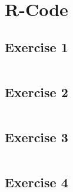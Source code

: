 \documentclass{article}
\begin{document}
    
  \section{R-Code}
    \subsection{Exercise 1}\label{sec:RE1}
      \begin{lstlisting}[language=R]
      \end{lstlisting}
    \subsection{Exercise 2}\label{sec:RE2}
      \begin{lstlisting}[language=R]
      \end{lstlisting}
    \subsection{Exercise 3}\label{sec:RE3}
      \begin{lstlisting}[language=R]
      \end{lstlisting}
    \subsection{Exercise 4}\label{sec:RE4}
      \begin{lstlisting}[language=R]
      \end{lstlisting}
\end{document}
